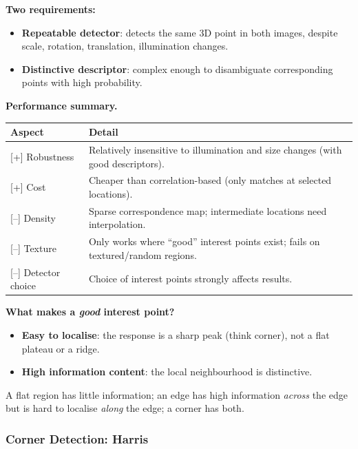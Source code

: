 \textbf{Two requirements:}
\begin{itemize}
  \item \textbf{Repeatable detector}: detects the same 3D point in both images, despite scale, rotation, translation, illumination changes.
  \item \textbf{Distinctive descriptor}: complex enough to disambiguate corresponding points with high probability.
\end{itemize}

\textbf{Performance summary.}
\begin{center}
\renewcommand{\arraystretch}{1.3}
\begin{tabular}{@{} l p{10cm} @{}}
\toprule
\textbf{Aspect} & \textbf{Detail} \\
\midrule
{[+]} Robustness & Relatively insensitive to illumination and size changes (with good descriptors). \\
{[+]} Cost & Cheaper than correlation-based (only matches at selected locations). \\
{[--]} Density & Sparse correspondence map; intermediate locations need interpolation. \\
{[--]} Texture & Only works where ``good'' interest points exist; fails on textured/random regions. \\
{[--]} Detector choice & Choice of interest points strongly affects results. \\
\bottomrule
\end{tabular}
\end{center}

\separator

\textbf{What makes a \emph{good} interest point?}
\begin{itemize}
  \item \textbf{Easy to localise}: the response is a sharp peak (think corner), not a flat plateau or a ridge.
  \item \textbf{High information content}: the local neighbourhood is distinctive.
\end{itemize}
A flat region has little information; an edge has high information \emph{across} the edge but is hard to localise \emph{along} the edge; a corner has both.

\bigseparator

\subsubsection{Corner Detection: Harris}

